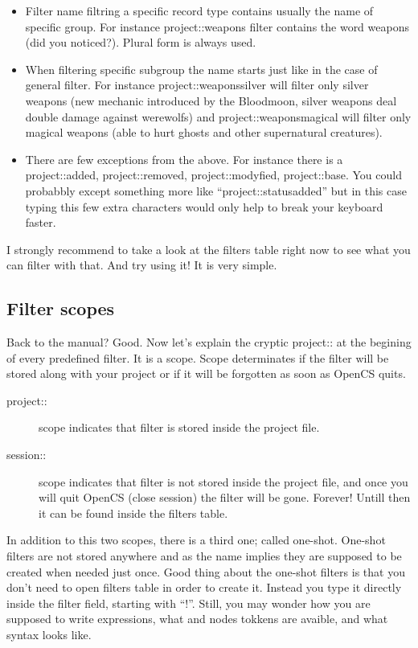 \begin{itemize}
 \item Filter name filtring a specific record type contains usually the name of specific group. For instance project::weapons filter contains the word weapons (did you noticed?). Plural form is always used.
 \item When filtering specific subgroup the name starts just like in the case of general filter. For instance project::weaponssilver will filter only silver weapons (new mechanic introduced by the Bloodmoon, silver weapons deal double damage against werewolfs) and project::weaponsmagical will filter only magical weapons (able to hurt ghosts and other supernatural creatures).
 \item There are few exceptions from the above. For instance there is a project::added, project::removed, project::modyfied, project::base. You could probabbly except something more like ``project::statusadded'' but in this case typing this few extra characters would only help to break your keyboard faster.
\end{itemize}

I strongly recommend to take a look at the filters table right now to see what you can filter with that. And try using it! It is very simple.

\subsection{Filter scopes}
Back to the manual? Good. Now let's explain the cryptic project:: at the begining of every predefined filter. It is a scope. Scope determinates if the filter will be stored along with your project or if it will be forgotten as soon as OpenCS quits.
\begin{description}
 \item[project::] scope indicates that filter is stored inside the project file.
 \item[session::] scope indicates that filter is not stored inside the project file, and once you will quit OpenCS (close session) the filter will be gone. Forever! Untill then it can be found inside the filters table.
\end{description}
In addition to this two scopes, there is a third one; called one-shot. One-shot filters are not stored anywhere and as the name implies they are supposed to be created when needed just once. Good thing about the one-shot filters is that you don't need to open filters table in order to create it. Instead you type it directly inside the filter field, starting with ``!''.
\linebreak
Still, you may wonder how you are supposed to write expressions, what and nodes tokkens are avaible, and what syntax looks like.

